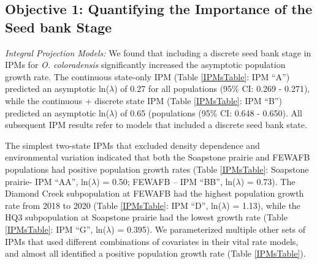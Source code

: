 \documentclass[12pt, letterpaper]{article}
\begin{document}
\subsection{Objective 1: Quantifying the Importance of the Seed bank Stage}

\textit{Integral Projection Models:} We found that including a discrete seed bank stage in IPMs for \textit{O. coloradensis} significantly increased the asymptotic population growth rate. The continuous state-only IPM (Table \ref{IPMsTable}: IPM “A”) predicted an asymptotic ln($\lambda$) of 0.27 for all populations (95\% CI: 0.269 - 0.271), while the continuous + discrete state IPM (Table \ref{IPMsTable}: IPM “B”) predicted an asymptotic ln($\lambda$) of 0.65 (populations (95\% CI: 0.648 - 0.650). All subsequent IPM results refer to models that included a discrete seed bank state. 

The simplest two-state IPMs that excluded density dependence and environmental variation indicated that both the Soapstone prairie and FEWAFB populations had positive population growth rates (Table \ref{IPMsTable}: Soapstone prairie- IPM “AA”, ln($\lambda$) = 0.50;  FEWAFB – IPM “BB”, ln($\lambda$) =  0.73). The Diamond Creek subpopulation at FEWAFB had the highest population growth rate from 2018 to 2020 (Table \ref{IPMsTable}: IPM “D”, ln($\lambda$) = 1.13), while the HQ3 subpopulation at Soapstone prairie had the lowest growth rate (Table \ref{IPMsTable}: IPM “G”, ln($\lambda$) = 0.395). We parameterized multiple other sets of IPMs that used different combinations of covariates in their vital rate models, and almost all identified a positive population growth rate (Table \ref{IPMsTable}).   
\end{document}
